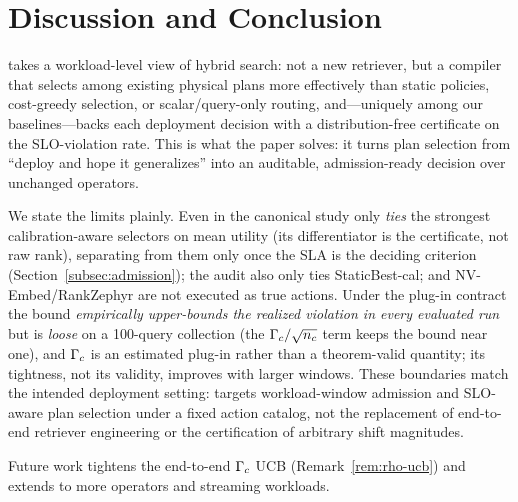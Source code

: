 \section{Discussion and Conclusion}
\label{sec:discussion}

\CWC{} takes a workload-level view of hybrid search: not a new retriever, but a compiler that selects among existing physical plans more effectively than static policies, cost-greedy selection, or scalar/query-only routing, and---uniquely among our baselines---backs each deployment decision with a distribution-free certificate on the SLO-violation rate. This is what the paper solves: it turns plan selection from ``deploy and hope it generalizes'' into an auditable, admission-ready decision over unchanged operators.

We state the limits plainly. Even in the canonical study \CWC{} only \emph{ties} the strongest calibration-aware selectors on mean utility (its differentiator is the certificate, not raw rank), separating from them only once the SLA is the deciding criterion (Section~\ref{subsec:admission}); the audit also only ties StaticBest-cal; and NV-Embed/RankZephyr are not executed as true actions. Under the plug-in contract the bound \emph{empirically upper-bounds the realized violation in every evaluated run} but is \emph{loose} on a 100-query collection (the $\Gamma_c/\sqrt{n_c}$ term keeps the bound near one), and $\Gamma_c$ is an estimated plug-in rather than a theorem-valid quantity; its tightness, not its validity, improves with larger windows. These boundaries match the intended deployment setting: \CWC{} targets workload-window admission and SLO-aware plan selection under a fixed action catalog, not the replacement of end-to-end retriever engineering or the certification of arbitrary shift magnitudes.

Future work tightens the end-to-end $\Gamma_c$ UCB (Remark~\ref{rem:rho-ucb}) and extends \CWC{} to more operators and streaming workloads.
